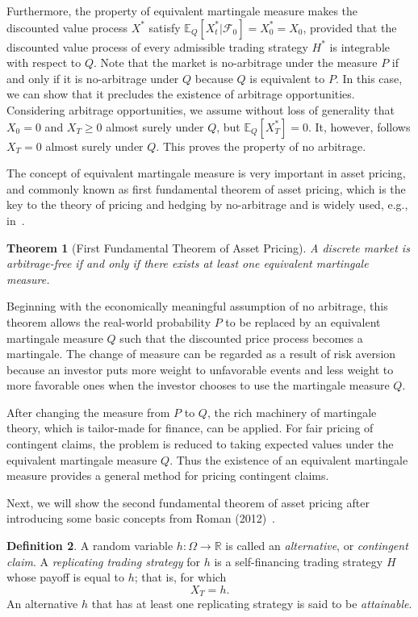 \documentclass[a4paper]{article}
\newtheorem{theorem}{Theorem}[section]
\theoremstyle{definition}
\newtheorem{definition}[theorem]{Definition}
\numberwithin{equation}{section}
\begin{document}
Furthermore, the property of equivalent martingale measure makes the discounted value process $X^*$ satisfy $\mathbb E_Q[X^*_t|\mathcal F_0]=X^*_0=X_0$, provided that the discounted value process of every admissible trading strategy $H^*$ is integrable with respect to $Q$. Note that the market is no-arbitrage under the measure $P$ if and only if it is no-arbitrage under $Q$ because $Q$ is equivalent to $P$. In this case, we can show that it precludes the existence of arbitrage opportunities. Considering arbitrage opportunities, we assume without loss of generality that $X_0=0$ and $X_T\geq0$ almost surely under $Q$, but $\mathbb E_Q[X^*_T]=0$. It, however, follows $X_T=0$ almost surely under $Q$. This proves the property of no arbitrage.

The concept of equivalent martingale measure is very important in asset pricing, and commonly known as first fundamental theorem of asset pricing, which is the key to the theory of pricing and hedging by no-arbitrage and is widely used, e.g., in~\cite{th:first_FTAP,HP 81}.
\begin{theorem}[First Fundamental Theorem of Asset Pricing]
A discrete market is arbitrage-free if and only if there exists at least one equivalent martingale measure.
\end{theorem}

Beginning with the economically meaningful assumption of no arbitrage, this theorem allows the real-world probability $P$ to be replaced by an equivalent martingale measure $Q$ such that the discounted price process becomes a martingale. The change of measure can be regarded as a result of risk aversion because an investor puts more weight to unfavorable events and less weight to more favorable ones when the investor chooses to use the martingale measure $Q$.

After changing the measure from $P$ to $Q$, the rich machinery of martingale theory, which is tailor-made for finance, can be applied. For fair pricing of contingent claims, the problem is reduced to taking expected values under the equivalent martingale measure $Q$. Thus the existence of an equivalent martingale measure provides a general
method for pricing contingent claims.

Next, we will show the second fundamental theorem of asset pricing after introducing some basic concepts from Roman (2012)~\cite{def_complete}.
\begin{definition}
A random variable $h:\Omega\rightarrow\mathbb R$ is called an \emph{alternative}, or \emph{contingent claim}. A \emph{replicating trading strategy} for $h$ is a self-financing trading strategy $H$ whose payoff is equal to $h$; that is, for which
$$X_T=h.$$
An alternative $h$ that has at least one replicating strategy is said to be \emph{attainable}.
\end{definition}
\end{document}
